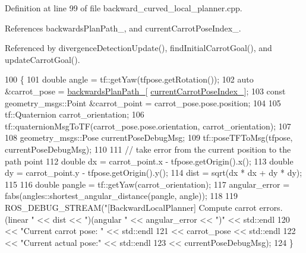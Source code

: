 Definition at line 99 of file backward\+\_\+curved\+\_\+local\+\_\+planner.\+cpp.



References backwards\+Plan\+Path\+\_\+, and current\+Carrot\+Pose\+Index\+\_\+.



Referenced by divergence\+Detection\+Update(), find\+Initial\+Carrot\+Goal(), and update\+Carrot\+Goal().


\begin{DoxyCode}
100         \{
101             \textcolor{keywordtype}{double} angle = tf::getYaw(tfpose.getRotation());
102             \textcolor{keyword}{auto} &carrot\_pose = \hyperlink{classcl__move__base__z_1_1backward__local__planner_1_1BackwardLocalPlanner_ad9cde5c85f782cab2ddb4030e3c3f2cf}{backwardsPlanPath\_}[
      \hyperlink{classcl__move__base__z_1_1backward__local__planner_1_1BackwardLocalPlanner_a2e8f2b78bc97f27c5fa431f3af2261ed}{currentCarrotPoseIndex\_}];
103             \textcolor{keyword}{const} geometry\_msgs::Point &carrot\_point = carrot\_pose.pose.position;
104 
105             tf::Quaternion carrot\_orientation;
106             tf::quaternionMsgToTF(carrot\_pose.pose.orientation, carrot\_orientation);
107 
108             geometry\_msgs::Pose currentPoseDebugMsg;
109             tf::poseTFToMsg(tfpose, currentPoseDebugMsg);
110 
111             \textcolor{comment}{// take error from the current position to the path point}
112             \textcolor{keywordtype}{double} dx = carrot\_point.x - tfpose.getOrigin().x();
113             \textcolor{keywordtype}{double} dy = carrot\_point.y - tfpose.getOrigin().y();
114             dist = sqrt(dx * dx + dy * dy);
115 
116             \textcolor{keywordtype}{double} pangle = tf::getYaw(carrot\_orientation);
117             angular\_error = fabs(angles::shortest\_angular\_distance(pangle, angle));
118 
119             ROS\_DEBUG\_STREAM(\textcolor{stringliteral}{"[BackwardLocalPlanner] Compute carrot errors. (linear "} << dist << \textcolor{stringliteral}{")(angular
       "} << angular\_error << \textcolor{stringliteral}{")"} << std::endl
120                                                                                       << \textcolor{stringliteral}{"Current carrot
       pose: "} << std::endl
121                                                                                       << carrot\_pose << 
      std::endl
122                                                                                       << \textcolor{stringliteral}{"Current actual
       pose:"} << std::endl
123                                                                                       << 
      currentPoseDebugMsg);
124         \}
\end{DoxyCode}
